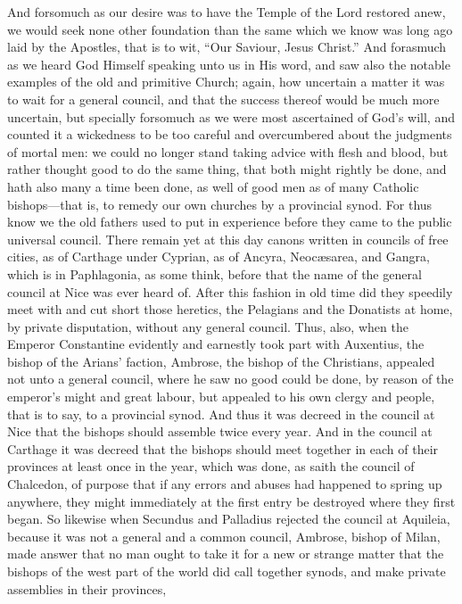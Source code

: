 And forsomuch as our desire was to have the Temple of the Lord restored
anew, we would seek none other foundation than the same which we know
was long ago laid by the Apostles, that is to wit, “Our Saviour,
Jesus Christ.” And forasmuch as we heard God Himself speaking
unto us in His word, and saw also the notable examples of the old and
primitive Church; again, how uncertain a matter
it was to wait for a general council, and that the success thereof would
be much more uncertain, but specially forsomuch as we were most ascertained
of God’s will, and counted it a wickedness to be too careful and
overcumbered about the judgments of mortal men: we could no longer stand
taking advice with flesh and blood, but rather thought good to do the
same thing, that both might rightly be done, and hath also many a time
been done, as well of good men as of many Catholic bishops—that
is, to remedy our own churches by a provincial synod. For thus
know we the old fathers used to put in experience before they came to
the public universal council. There remain yet at this day canons
written in councils of free cities, as of Carthage under Cyprian, as
of Ancyra, Neocæsarea, and Gangra, which is in Paphlagonia, as
some think, before that the name of the general council at Nice was
ever heard of. After this fashion in old time did they speedily
meet with and cut short those heretics, the Pelagians and the Donatists
at home, by private disputation, without any general council.
Thus, also, when the Emperor Constantine evidently and earnestly took
part with Auxentius, the bishop of the Arians’ faction, Ambrose,
the bishop of the Christians, appealed not
unto a general council, where he saw no good could be done, by reason
of the emperor’s might and great labour, but appealed to his own
clergy and people, that is to say, to a provincial synod. And
thus it was decreed in the council at Nice that the bishops should assemble
twice every year. And in the council at Carthage it was decreed
that the bishops should meet together in each of their provinces at
least once in the year, which was done, as saith the council of Chalcedon,
of purpose that if any errors and abuses had happened to spring up anywhere,
they might immediately at the first entry be destroyed where they first
began. So likewise when Secundus and Palladius rejected the council
at Aquileia, because it was not a general and a common council, Ambrose,
bishop of Milan, made answer that no man ought to take it for a new
or strange matter that the bishops of the west part of the world did
call together synods, and make private assemblies in their provinces,
